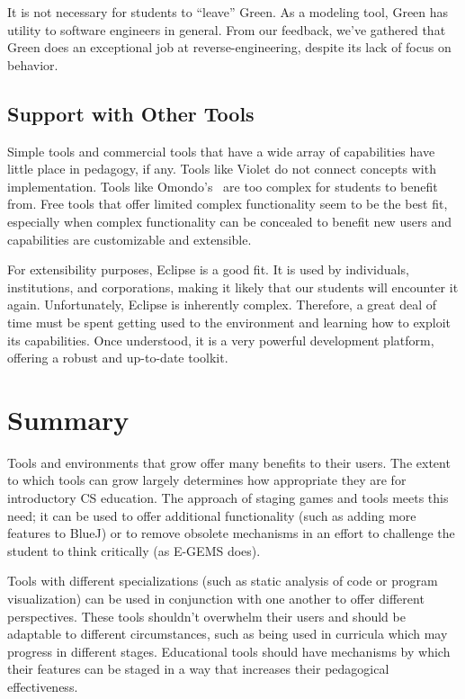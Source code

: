\documentclass{sig-alt-release}
\begin{document}
      It is not necessary for students to ``leave'' Green. As a modeling tool,
      Green has utility to software engineers in general. From our feedback,
      we've gathered that Green does an exceptional job at reverse-engineering,
      despite its lack of focus on behavior.

  \subsection{Support with Other Tools}
    Simple tools and commercial tools that have a wide array of capabilities
    have little place in pedagogy, if any. Tools like Violet do not connect
    concepts with implementation. Tools like Omondo's \eclipseuml\ are too
    complex for students to benefit from. Free tools that offer limited complex
    functionality seem to be the best fit, especially when complex functionality
    can be concealed to benefit new users and capabilities are customizable and
    extensible.

    For extensibility purposes, Eclipse is a good fit. It is used by
    individuals, institutions, and corporations, making it likely that our
    students will encounter it again. Unfortunately, Eclipse is inherently
    complex. Therefore, a great deal of time must be spent getting used to the
    environment and learning how to exploit its capabilities. Once understood,
    it is a very powerful development platform, offering a robust and up-to-date
    toolkit.

\section{Summary}
  Tools and environments that grow offer many benefits to their users. The
  extent to which tools can grow largely determines how appropriate they are
  for introductory CS education. The approach of staging games and tools meets
  this need; it can be used to offer additional functionality (such as adding
  more features to BlueJ) or to remove obsolete mechanisms in an effort to
  challenge the student to think critically (as E-GEMS does).

  Tools with different specializations (such as static analysis of code or
  program visualization) can be used in conjunction with one another to offer
  different perspectives. These tools shouldn't overwhelm their users and should
  be adaptable to different circumstances, such as being used in curricula which
  may progress in different stages. Educational tools should have mechanisms by
  which their features can be staged in a way that increases their pedagogical
  effectiveness.
\end{document}
